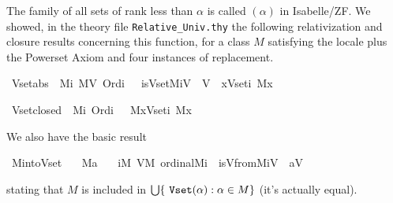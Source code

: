 The
family of all sets of rank less than $\alpha$ is called
$(\alpha)$ in Isabelle/ZF. We showed, in the theory file
\texttt{Relative\_Univ.thy}
 the following
relativization and closure results concerning this function, for a
class $M$ satisfying the locale 
plus the Powerset Axiom and four instances of replacement.
%
\begin{isabelle}
\isamarkupfalse%
\ Vset{\isacharunderscore}abs{\isacharcolon}\ {\isachardoublequoteopen}{\isasymlbrakk}\ M{\isacharparenleft}i{\isacharparenright}{\isacharsemicolon}\ M{\isacharparenleft}V{\isacharparenright}{\isacharsemicolon}\ Ord{\isacharparenleft}i{\isacharparenright}\ {\isasymrbrakk}\ {\isasymLongrightarrow}\ is{\isacharunderscore}Vset{\isacharparenleft}M{\isacharcomma}i{\isacharcomma}V{\isacharparenright}\ {\isasymlongleftrightarrow}\ V\ {\isacharequal}\ {\isacharbraceleft}x{\isasymin}Vset{\isacharparenleft}i{\isacharparenright}{\isachardot}\ M{\isacharparenleft}x{\isacharparenright}{\isacharbraceright}{\isachardoublequoteclose}
\end{isabelle}
\begin{isabelle}
\isamarkupfalse%
\ Vset{\isacharunderscore}closed{\isacharcolon}\ {\isachardoublequoteopen}{\isasymlbrakk}\ M{\isacharparenleft}i{\isacharparenright}{\isacharsemicolon}\ Ord{\isacharparenleft}i{\isacharparenright}\ {\isasymrbrakk}\ {\isasymLongrightarrow}\ M{\isacharparenleft}{\isacharbraceleft}x{\isasymin}Vset{\isacharparenleft}i{\isacharparenright}{\isachardot}\ M{\isacharparenleft}x{\isacharparenright}{\isacharbraceright}{\isacharparenright}{\isachardoublequoteclose}
\end{isabelle}
We also have the basic result
\begin{isabelle}
\isamarkupfalse%
\ M{\isacharunderscore}into{\isacharunderscore}Vset{\isacharcolon}\isanewline
\ \ \ {\isachardoublequoteopen}M{\isacharparenleft}a{\isacharparenright}{\isachardoublequoteclose}\isanewline
\ \ \ {\isachardoublequoteopen}{\isasymexists}i{\isacharbrackleft}M{\isacharbrackright}{\isachardot}\ {\isasymexists}V{\isacharbrackleft}M{\isacharbrackright}{\isachardot}\ ordinal{\isacharparenleft}M{\isacharcomma}i{\isacharparenright}\ {\isasymand}\ is{\isacharunderscore}Vfrom{\isacharparenleft}M{\isacharcomma}{}{\isacharcomma}i{\isacharcomma}V{\isacharparenright}\ {\isasymand}\ a{\isasymin}V{\isachardoublequoteclose}
\end{isabelle}
stating that $M$ is included in 
$\union\{\isatt{Vset}(\alpha) : \alpha\in M\}$ (it's actually equal).

